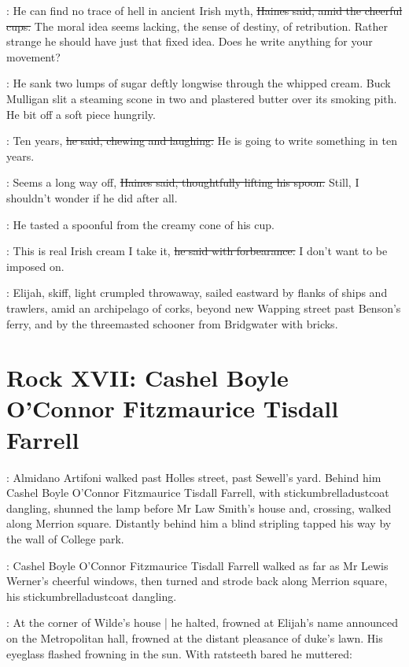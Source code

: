 \haines:
He can find no trace of hell in ancient Irish myth,
\sout{Haines said,
amid the cheerful cups.}
The moral idea seems lacking,
the sense of destiny, of retribution.
Rather strange he should have just that fixed idea.
Does he write anything for your movement?

:
He sank two lumps of sugar deftly longwise
through the whipped cream.
Buck Mulligan slit a steaming scone in two
and plastered butter
over its smoking pith.
He bit off a soft piece hungrily.

\mulligan:
Ten years,
\sout{he said,
chewing and laughing.}
He is going to write something in ten years.%

\haines:
Seems a long way off,
\sout{Haines said,
thoughtfully lifting his spoon.}
Still, I shouldn't wonder if he did after all.

:
He tasted a spoonful from the creamy cone of his cup.

\haines:
This is real Irish cream I take it,
\sout{he said with forbearance.}
I don't want to be imposed on.

\begin{interject}
    :
    Elijah,
    skiff,
    light crumpled throwaway,
    sailed eastward by flanks of
    ships and trawlers,
    amid an archipelago of corks,
    beyond new Wapping street
    past Benson's ferry,
    and by the threemasted schooner  from
    Bridgwater with bricks.
\end{interject}


\section*{Rock XVII: Cashel Boyle O'Connor Fitzmaurice Tisdall Farrell}

:
Almidano Artifoni walked past Holles street,
past Sewell's yard.
Behind him
Cashel Boyle O'Connor Fitzmaurice Tisdall Farrell,
with stick\-umbrella\-dust\-coat dangling,
shunned the lamp before Mr Law Smith's house
and, crossing, walked along Merrion square.
Distantly behind him
a blind stripling tapped his way
by the wall of College park.

:
Cashel Boyle O'Connor Fitzmaurice Tisdall Farrell
walked as far as
Mr Lewis Werner's cheerful windows,
then turned and strode back along Merrion square,
his stick\-umbrella\-dust\-coat dangling.

:
At the corner of Wilde's house |
he halted,
frowned at Elijah's name announced on the Metropolitan hall,
frowned at the distant pleasance of duke's lawn.
His eyeglass flashed frowning in the sun.
With ratsteeth bared he muttered:

